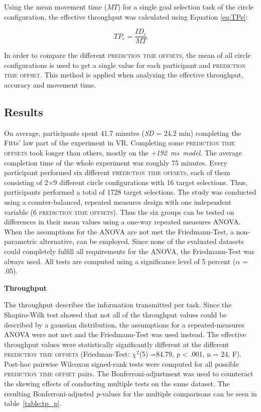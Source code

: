 \documentclass[sigconf]{acmart}
\begin{document}
Using the mean movement time ($MT$) for a single goal selection task of the circle configuration, the effective throughput was calculated using Equation \ref{eq:TPe}:

\begin{equation}
\label{eq:TPe}
  TP_e = \frac{ID_e}{MT}
\end{equation}

In order to compare the different \textsc{prediction time offsets}, the mean of all circle configurations is used to get a single value for each participant and \textsc{prediction time offset}. This method is applied when analyzing the effective throughput, accuracy and movement time.

\subsection{Results}
On average, participants spent 41.7 minutes (\textit{SD} = 24.2 min) completing the Fitts' law part of the experiment in VR. Completing some \textsc{prediction time offsets} took longer than others, mostly on the \mbox{\textit{+192 ms model}}. The average completion time of the whole experiment was roughly 75 minutes.
Every participant performed six different \textsc{prediction time offsets}, each of them consisting of 2$\times$9 different circle configurations with 16 target selections. Thus, participants performed a total of 1728 target selections.
The study was conducted using a counter-balanced, repeated measures design with one independent variable (6 \textsc{prediction time offsets}). Thus the six groups can be tested on differences in their mean values using a one-way repeated measures ANOVA. When the assumptions for the ANOVA are not met the Friedmann-Test, a non-parametric alternative, can be employed. Since none of the evaluated datasets could completely fulfill all requirements for the ANOVA, the Friedmann-Test was always used. All tests are computed using a significance level of 5 percent ($\alpha$ = .05). 

\textbf{Throughput}

The throughput describes the information transmitted per task. Since the Shapiro-Wilk test showed that not all of the throughput values could be described by a gaussian distribution, the assumptions for a repeated-measures ANOVA were not met and the Friedmann-Test was used instead. 
The effective throughput values were statistically significantly different at the different \textsc{prediction time offsets} (Friedman-Test: $\chi^2$(5) =84.79, \textit{p} < .001, n = 24, F). 
Post-hoc pairwise Wilcoxon signed-rank tests were computed for all possible \textsc{prediction time offset} pairs. The Bonferroni-adjustment was used to counteract the skewing effects of conducting multiple tests on the same dataset. 
The resulting Bonferroni-adjusted \textit{p}-values for the multiple comparisons can be seen in table~\ref{table:tp_p}.
\end{document}
